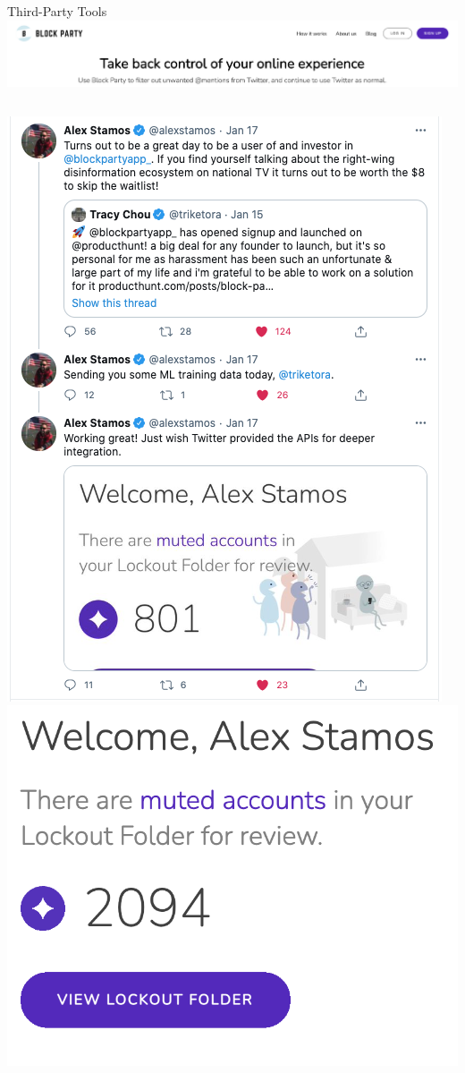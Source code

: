 \documentclass[nobackground,dvipsnames,table,aspectratio=169]{beamer}
\begin{document}
\begin{frame}{Third-Party Tools}
    \includegraphics[width=\textwidth]{block-party}
    \begin{columns}[T]
            \includegraphics[width=\textwidth]{block-party-stamos-tweets}
            \includegraphics[width=\textwidth]{block-party-2}

\end{columns}
\end{frame}
\end{document}
